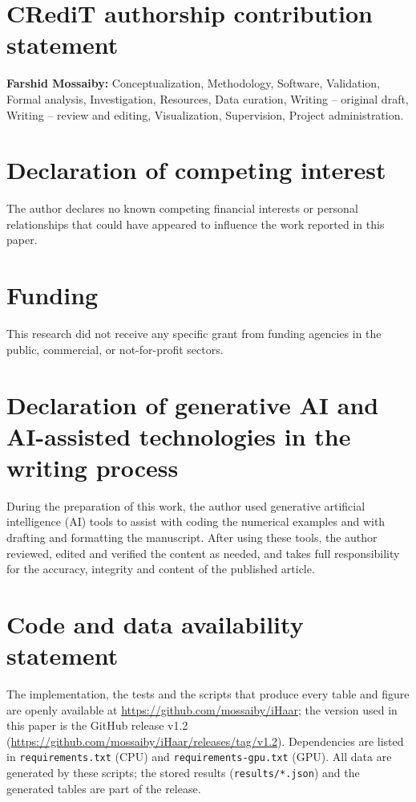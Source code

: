 \documentclass[preprint,12pt]{elsarticle}
\theoremstyle{remark}
\newcommand{\repo}{\url{https://github.com/mossaiby/iHaar}}
\newcommand{\archive}{\url{https://github.com/mossaiby/iHaar/releases/tag/v1.2}}
\begin{document}
\section*{CRediT authorship contribution statement}
\textbf{Farshid Mossaiby:} Conceptualization, Methodology, Software, Validation, Formal analysis,
Investigation, Resources, Data curation, Writing -- original draft, Writing -- review and editing,
Visualization, Supervision, Project administration.

\section*{Declaration of competing interest}
The author declares no known competing financial interests or personal relationships that could have
appeared to influence the work reported in this paper.

\section*{Funding}
This research did not receive any specific grant from funding agencies in the public, commercial, or
not-for-profit sectors.

\section*{Declaration of generative AI and AI-assisted technologies in the writing process}
During the preparation of this work, the author used generative artificial intelligence (AI) tools to
assist with coding the numerical examples and with drafting and formatting the manuscript. After using
these tools, the author reviewed, edited and verified the content as needed, and takes full
responsibility for the accuracy, integrity and content of the published article.

\section*{Code and data availability statement}
The implementation, the tests and the scripts that produce every table and figure are openly available
at \repo; the version used in this paper is the GitHub release v1.2 (\archive). Dependencies are listed in
\texttt{requirements.txt} (CPU) and \texttt{requirements-gpu.txt} (GPU). All data are generated by these
scripts; the stored results (\texttt{results/*.json}) and the generated tables are part of the release.

\appendix
\end{document}
